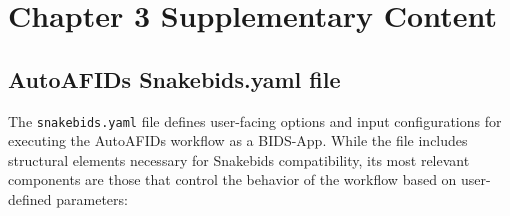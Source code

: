 \chapter{Chapter 3 Supplementary Content}\label{app:ch3suppcontent}
\newpage

\section{AutoAFIDs Snakebids.yaml file}
\label{app:yaml}
The \texttt{snakebids.yaml} file defines user-facing options and input configurations for executing the AutoAFIDs workflow as a BIDS-App. While the file includes structural elements necessary for Snakebids compatibility, its most relevant components are those that control the behavior of the workflow based on user-defined parameters:
